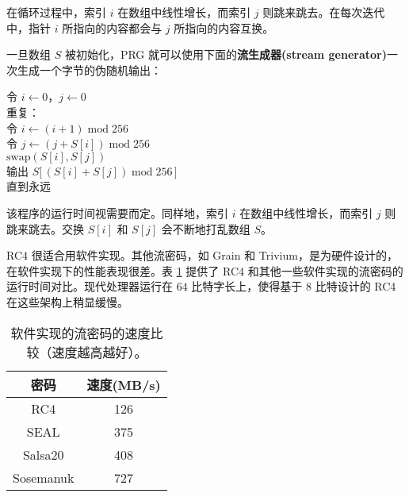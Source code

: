 在循环过程中，索引 $i$ 在数组中线性增长，而索引 $j$ 则跳来跳去。在每次迭代中，指针 $i$ 所指向的内容都会与 $j$ 所指向的内容互换。

一旦数组 $S$ 被初始化，PRG 就可以使用下面的\textbf{流生成器(stream generator)}一次生成一个字节的伪随机输出：

\vspace*{5pt}

\hspace*{5pt} 令 $i\leftarrow0$，$j\leftarrow0$\\
\hspace*{26pt} 重复：\\
\hspace*{50pt} 令 $i\leftarrow(i+1) \;\mathrm{mod}\;256$\\
\hspace*{50pt} 令 $j\leftarrow(j+S[i])\;\mathrm{mod}\;256$\\
\hspace*{50pt} $\mathrm{swap}(S[i],S[j])$ \\
\hspace*{50pt} 输出 $S\big[\,(S[i]+S[j])\;\mathrm{mod}\;256\,\big]$ \\
\hspace*{26pt} 直到永远

\vspace*{5pt}

该程序的运行时间视需要而定。同样地，索引 $i$ 在数组中线性增长，而索引 $j$ 则跳来跳去。交换 $S[i]$ 和 $S[j]$ 会不断地打乱数组 $S$。

\begin{snote}[RC4的加密速度。]
RC4 很适合用软件实现。其他流密码，如 Grain 和 Trivium，是为硬件设计的，在软件实现下的性能表现很差。表 \ref{tab:3-1} 提供了 RC4 和其他一些软件实现的流密码的运行时间对比。现代处理器运行在 $64$ 比特字长上，使得基于 $8$ 比特设计的 RC4 在这些架构上稍显缓慢。
\end{snote}

\begin{table}
  \centering
  \begin{tabular}{|c|c|}
    \hline
    密码 & 速度\footnotemark[1](MB/s)\\
    \hline
    RC4 & 126\\
    SEAL & 375\\
    Salsa20 & 408\\
    Sosemanuk & 727\\
    \hline
  \end{tabular}
  \caption{软件实现的流密码的速度比较（速度越高越好）。}
  \label{tab:3-1}
\end{table}

